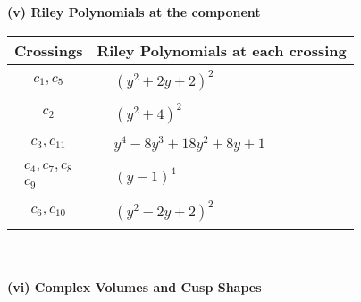 \documentclass[1p]{elsarticle_modified}
\theoremstyle{definition}
\begin{document}
\newpage\renewcommand{\arraystretch}{1}
\flushleft \textbf{(v) Riley Polynomials at the component}\newline \\
\begin{tabular}{m{50pt}|m{274pt}}
Crossings & \hspace{64pt}Riley Polynomials at each crossing \\
\hline $$\begin{aligned}c_{1},c_{5}\end{aligned}$$&$\begin{aligned}
&(y^2+2 y+2)^2
\end{aligned}$\\
\hline $$\begin{aligned}c_{2}\end{aligned}$$&$\begin{aligned}
&(y^2+4)^2
\end{aligned}$\\
\hline $$\begin{aligned}c_{3},c_{11}\end{aligned}$$&$\begin{aligned}
&y^4-8 y^3+18 y^2+8 y+1
\end{aligned}$\\
\hline $$\begin{aligned}c_{4},c_{7},c_{8}\\c_{9}\end{aligned}$$&$\begin{aligned}
&(y-1)^4
\end{aligned}$\\
\hline $$\begin{aligned}c_{6},c_{10}\end{aligned}$$&$\begin{aligned}
&(y^2-2 y+2)^2
\end{aligned}$\\
\hline
\end{tabular}\\~\\
\newpage\flushleft \textbf{(vi) Complex Volumes and Cusp Shapes}
\end{document}
